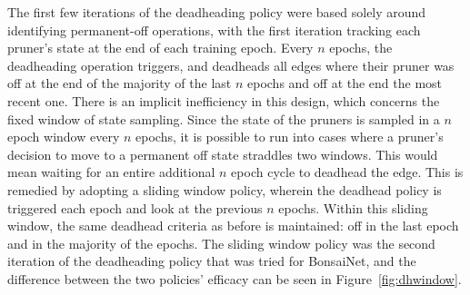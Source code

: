 The first few iterations of the deadheading policy were based solely around identifying permanent-off operations, with
the first iteration tracking each pruner's state at the end of each training epoch. Every $n$ epochs, the deadheading operation triggers,
and deadheads all edges where their pruner was off at the end of the majority of the last $n$ epochs and off at the end
the most recent one. There is an implicit inefficiency in this design, which concerns the fixed window of state sampling.
Since the state of the pruners is sampled in a $n$ epoch window every $n$ epochs,
it is possible to run into cases where a pruner's decision to move to a permanent off state straddles two windows. This would mean
waiting for an entire additional $n$ epoch cycle to deadhead the edge. This is remedied by adopting a sliding window
policy, wherein the deadhead policy is triggered each epoch and look at the previous $n$ epochs. Within this sliding window,
the same deadhead criteria as before is maintained: off in the last epoch and in the majority of the epochs. The sliding window
policy was the second iteration of the deadheading policy that was tried for BonsaiNet, and the difference between the
two policies' efficacy can be seen in Figure~\ref{fig:dhwindow}.

